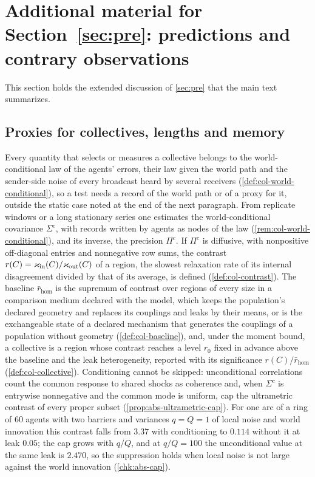 \section{Additional material for \texorpdfstring{Section~\ref{sec:pre}}{Section 16}: predictions and contrary observations}\label{sup:pre}

This section holds the extended discussion of \cref{sec:pre} that the main text summarizes.

\subsection{Proxies for collectives, lengths and memory}\label{sup:pre-proxies-for-collectives-lengths-and-memo}

Every quantity that selects or measures a collective belongs to the world-conditional law of the agents' errors, their law given the world path and the sender-side noise of every broadcast heard by several receivers (\cref{def:col-world-conditional}), so a test needs a record of the world path or of a proxy for it, outside the static case noted at the end of the next paragraph. From replicate windows or a long stationary series one estimates the world-conditional covariance $\Sigma^c$, with records written by agents as nodes of the law (\cref{rem:col-world-conditional}), and its inverse, the precision $\Pi^c$. If $\Pi^c$ is diffusive, with nonpositive off-diagonal entries and nonnegative row sums, the contrast $r(C)=\varkappa_{\mathrm{in}}(C)/\varkappa_{\mathrm{out}}(C)$ of a region, the slowest relaxation rate of its internal disagreement divided by that of its average, is defined (\cref{def:col-contrast}). The baseline $\bar r_{\mathrm{hom}}$ is the supremum of contrast over regions of every size in a comparison medium declared with the model, which keeps the population's declared geometry and replaces its couplings and leaks by their means, or is the exchangeable state of a declared mechanism that generates the couplings of a population without geometry (\cref{def:col-baseline}), and, under the moment bound, a collective is a region whose contrast reaches a level $r_0$ fixed in advance above the baseline and the leak heterogeneity, reported with its significance $r(C)/\bar r_{\mathrm{hom}}$ (\cref{def:col-collective}). Conditioning cannot be skipped: unconditional correlations count the common response to shared shocks as coherence and, when $\Sigma^c$ is entrywise nonnegative and the common mode is uniform, cap the ultrametric contrast of every proper subset (\cref{prop:abs-ultrametric-cap}). For one arc of a ring of 60 agents with two barriers and variances $q=Q=1$ of local noise and world innovation this contrast falls from $3.37$ with conditioning to $0.114$ without it at leak $0.05$; the cap grows with $q/Q$, and at $q/Q=100$ the unconditional value at the same leak is $2.470$, so the suppression holds when local noise is not large against the world innovation (\cref{chk:abs-cap}).

